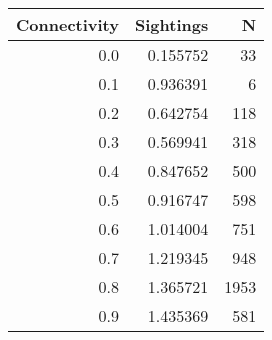 \begin{tabular}{rrr}
\toprule
 Connectivity &  Sightings &    N \\
\midrule
          0.0 &   0.155752 &   33 \\
          0.1 &   0.936391 &    6 \\
          0.2 &   0.642754 &  118 \\
          0.3 &   0.569941 &  318 \\
          0.4 &   0.847652 &  500 \\
          0.5 &   0.916747 &  598 \\
          0.6 &   1.014004 &  751 \\
          0.7 &   1.219345 &  948 \\
          0.8 &   1.365721 & 1953 \\
          0.9 &   1.435369 &  581 \\
\bottomrule
\end{tabular}

